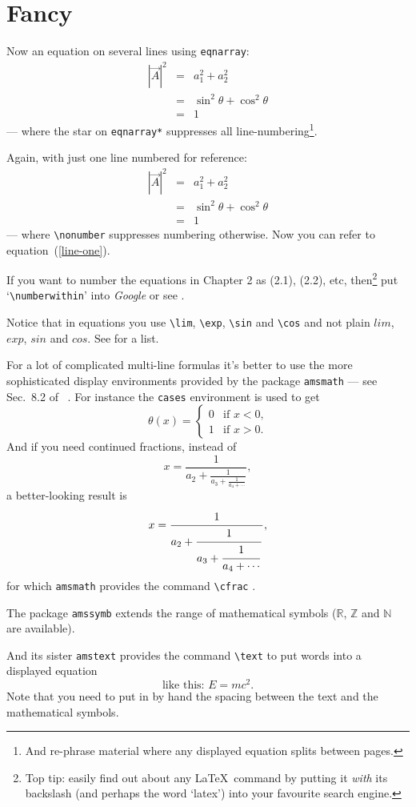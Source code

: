 \section{Fancy}
Now an equation on several lines using \verb+eqnarray+:
\begin{eqnarray*}
  |\vec A|^2 &=& a_1^2+a_2^2  \\
             &=& \sin^2\theta+\cos^2\theta \\
             &=& 1
\end{eqnarray*}--- where the star on \verb+eqnarray*+ suppresses
all line-numbering\footnote{And re-phrase material where any displayed
equation splits between pages.}.
\par
Again, with just one line numbered for reference:
\begin{eqnarray}
  |\vec A|^2 &=& a_1^2+a_2^2  \label{line-one}\\
             &=& \sin^2\theta+\cos^2\theta \nonumber \\
             &=& 1  \nonumber
\end{eqnarray}--- where \verb+\nonumber+ suppresses numbering
otherwise. Now you can refer to equation~(\ref{line-one}).
\par
If you want to number the equations in Chapter 2 as (2.1), (2.2), etc,
then\footnote{Top tip: easily find out about any \LaTeX\ command by
putting it \textit{with} its backslash (and perhaps the word \lq latex')
into your favourite search engine.} put \lq\verb+\numberwithin+' into
\textsl{Google} or see \cite[Sec 8.2.14]{MG}.
\par
Notice that in equations you use \verb+\lim+, \verb+\exp+, \verb+\sin+
and \verb+\cos+ and not plain $lim$, $exp$, $sin$ and $cos$. See
\cite[Sec.~3.3]{NSS} for a list.
\par
For a lot of complicated multi-line formulas it's better to use the more
sophisticated display environments provided by the package
\texttt{amsmath} --- see Sec.~8.2 of \comp\ \cite{MG}.
For instance the \texttt{cases} environment is used to get
\[\theta(x)=\begin{cases}0&\text{if $x<0$,}\\
		1&\text{if $x>0$.}\end{cases}\]
And if you need continued fractions, instead of 
\[x=\frac{1}{a_2+\frac{1}{a_3+\frac{1}{a_4+\cdots}}},\]a better-looking
result
is\[x=\frac{\strut1}{\displaystyle a_2+\frac{\strut1}{\displaystyle
a_3+\frac{\strut1}{\displaystyle a_4+\cdots}}},\]for which
\texttt{amsmath}
provides the command \verb+\cfrac+ \cite[Sec.~8.4.2]{MG}.
\par
The package \texttt{amssymb} \cite[Chap.~8]{MG} extends the range of
mathematical symbols (\eg\(\mathbb{R}\), \(\mathbb{Z}\) and
\(\mathbb{N}\) are available).
\par
And its sister \texttt{amstext} provides the command \verb+\text+ to
put words into a displayed equation \[ \text{like this: }E=mc^2. \]Note
that you need to put in by hand the spacing between the text and the
mathematical symbols.
%
